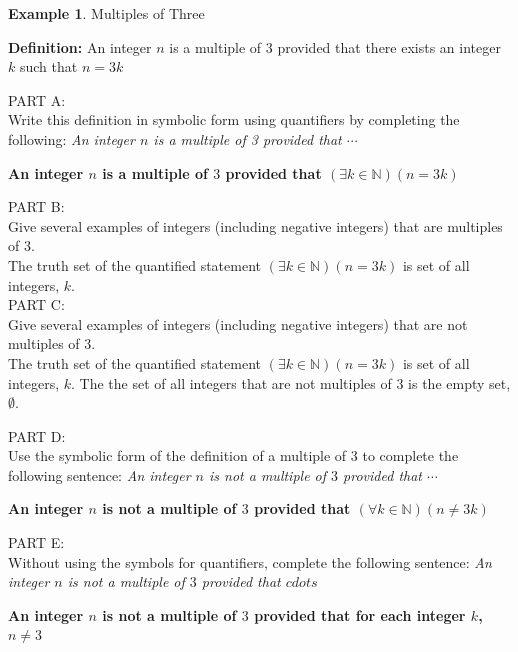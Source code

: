 \documentclass{book}
\theoremstyle{definition}
\newtheorem{example}{Example}[definition]
\theoremstyle{remark}
\newcommand{\bb}[1]{\mathbb{#1}}
\begin{document}
\begin{example}
Multiples of Three \cite[Chap.2, P.C.2.20]{ted} \\

\begin{tcolorbox}
    {\bf Definition:} An integer $n$ is a multiple of $3$ provided that there exists an integer $k$ such that $n = 3k$
\end{tcolorbox}

PART A: \\
Write this definition in symbolic form using quantifiers by completing the following: {\it An integer $n$ is a multiple of 3 provided that $\cdots$} \\
	\begin{center}
	    \bf An integer $n$ is a multiple of $3$ provided that $(\exists k \in \bb{N})(n = 3k)$
	\end{center}
	
PART B: \\
Give several examples of integers (including negative integers) that are multiples of 3. \\

The truth set of the quantified statement $(\exists k \in \bb{N})(n = 3k)$ is set of all integers, $k$. \\

PART C: \\
Give several examples of integers (including negative integers) that are not multiples of 3. \\

The truth set of the quantified statement $(\exists k \in \bb{N})(n = 3k)$ is set of all integers, $k$. The  the set of all integers that are not multiples of $3$ is the empty set, $\emptyset$. 

PART D: \\
Use the symbolic form of the definition of a multiple of $3$ to complete the following sentence: {\it An integer $n$ is not a multiple of $3$ provided that $\cdots$} \\
	\begin{center}
	\bf An integer $n$ is not a multiple of $3$ provided that $(\forall k \in \bb{N})(n \neq 3k)$
	\end{center}

PART E: \\
Without using the symbols for quantifiers, complete the following sentence: {\it An integer $n$ is not a multiple of $3$ provided that $cdots$} \\
	\begin{center}
	\bf An integer $n$ is not a multiple of $3$ provided that for each integer $k$, $n \neq 3$ 
	\end{center}
\end{example}
\end{document}
